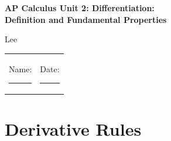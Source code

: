 \documentclass[11pt,a4paper]{article}
\newcommand{\worksheettitle}{AP Calculus Unit 2: Differentiation:\texorpdfstring{\\}{ } Definition and Fundamental Properties}
\newcommand{\worksheetauthor}{Lee}
\newcounter{basic}
\newcounter{practice}
\begin{document}
\begin{center}
 {\LARGE\bfseries \worksheettitle\par}\vspace{5pt}
 {\large \worksheetauthor}\\[9pt]
 \begin{tabularx}{\textwidth}{@{}X X@{}}
 Name: \rule{2.2in}{0.4pt} & Date: \rule{1.8in}{0.4pt}
 \end{tabularx}
\end{center}
\vspace{12pt}
\hypertarget{contents}{}%
{\setlength{\parskip}{0pt}\tableofcontents}
\clearpage

%
\section{Derivative Rules}\label{sec:rules}
\end{document}
